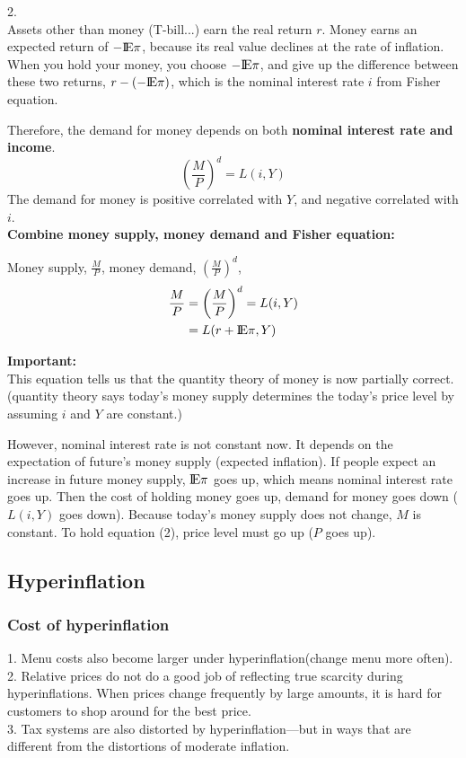 \documentclass[12pt]{article}
\begin{document}
2.\\
Assets other than money (T-bill...) earn the real return $ r $.
Money earns an expected return of $  - {\rm I\!{E}}\pi $, because its real value 
declines at the rate of inflation.
When you hold your money, you choose $  - {\rm I\!{E}}\pi $, and give up the 
difference between these two returns, $ r - ( - {\rm I\!{E}}\pi) $, which is the
nominal interest rate $ i $ from Fisher equation.

Therefore, the demand for money depends on both {\textbf {nominal interest rate and
income}}.
\begin{equation*}
\left( \frac{M}{P} \right) ^{d} = L(i,Y)
\end{equation*}
The demand for money is positive correlated with $ Y $, and negative correlated with
$ i $.\\

{\textbf {Combine money supply, money demand and Fisher equation:}}

Money supply, $ \frac{M}{P} $, money demand, $ \left( \frac{M}{P} \right) ^{d} $,
\begin{align}
\frac{M}{P} &= \left( \frac{M}{P} \right)^{d} = L(i,Y)\\
 &= L(r + {\rm I\!{E}}\pi, Y)
\end{align}

{\textbf {Important:}}\\
This equation tells us that the quantity theory of money is now partially correct.
(quantity theory says today's money supply determines the today's price level by 
assuming $ i $ and $ Y $ are constant.)

However, nominal interest rate is not constant now. It depends on the expectation
of future's money supply (expected inflation). If people expect an increase in future
money supply, $ {\rm I\!{E}}\pi $ goes up, which means nominal interest rate goes up.
Then the cost of holding money goes up, demand for money goes down ($ L(i,Y) $ goes 
down). Because today's money supply does not change, $ M $ is constant. To hold
equation (2), price level must go up ($ P $ goes up).


\subsection{Hyperinflation}
\subsubsection{Cost of hyperinflation}
1. Menu costs also become larger under hyperinflation(change menu more often).\\
2. Relative prices do not do a good job of reflecting true scarcity during 
hyperinflations. When prices change frequently by large amounts, it is hard for 
customers to shop around for the best price.\\
3. Tax systems are also distorted by hyperinflation—but in ways that are different 
from the distortions of moderate inflation.
\end{document}
